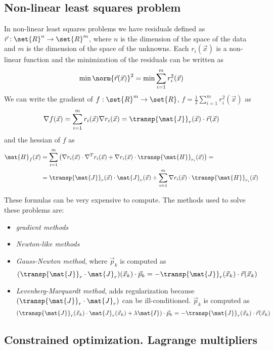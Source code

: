 \subsection{Non-linear least squares problem}
In non-linear least squares problems we have residuals defined as $\vec{r}: \set{R}^n \rightarrow \set{R}^m$, where $n$ is the dimension of the space of the data and $m$ is the dimension of the space of the unknowns. Each $r_i(\vec{x})$ is a non-linear function and the minimization of the residuals can be written as
$$ \min{\norm{\vec{r}(\vec{x})}^2} = \min{\sum_{i = 1}^{m}{r_i^2(\vec{x})}} $$
We can write the gradient of $f: \set{R}^m \rightarrow \set{R}$, $f = \frac{1}{2}\sum_{i = 1}^{m}{r_i^2(\vec{x})}$ as
$$ \nabla{f}(\vec{x}) = \sum_{i = 1}^{m}{r_i(\vec{x})\nabla{r_i}(\vec{x})} = \transp{\mat{J}}_r(\vec{x}) \cdot \vec{r}(\vec{x}) $$
and the hessian of $f$ as
$$
    \begin{aligned}
        \mat{H}_f(\vec{x}) &= \sum_{i = 1}^{m}{\left(\nabla{r_i}(\vec{x}) \cdot \nabla^T{r_i}(\vec{x}) +\nabla{r_i}(\vec{x}) \cdot \transp{\mat{H}}_{r_i}(\vec{x})\right)} =\\
        &= \transp{\mat{J}}_r(\vec{x}) \cdot \mat{J}_r(\vec{x}) + \sum_{i = 1}^{m}{\nabla{r_i}(\vec{x}) \cdot \transp{\mat{H}}_{r_i}(\vec{x})}
    \end{aligned}
$$

These formulas can be very expensive to compute. The methods used to solve these problems are:
\begin{itemize}
    \item \textit{gradient methods}
    \item \textit{Newton-like methods}
    \item \textit{Gauss-Newton method}, where $\vec{p}_k$ is computed as
    $$ (\transp{\mat{J}}_r \cdot \mat{J}_r)(\vec{x}_k) \cdot \vec{p}_k = -\transp{\mat{J}}_r(\vec{x}_k) \cdot \vec{r}(\vec{x}_k) $$
    \item \textit{Levenberg-Marquardt method}, adds regularization because $(\transp{\mat{J}}_r \cdot \mat{J}_r)$ can be ill-conditioned. $\vec{p}_k$ is computed as
    $$ (\transp{\mat{J}}_r(\vec{x}_k) \cdot \mat{J}_r(\vec{x}_k) + \lambda\mat{I}) \cdot \vec{p}_k = -\transp{\mat{J}}_r(\vec{x}_k) \cdot \vec{r}(\vec{x}_k) $$
\end{itemize}

\subsection{Constrained optimization. Lagrange multipliers}

